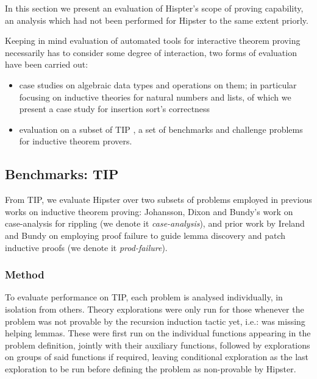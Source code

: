 \label{sec:evaluation}

In this section we present an evaluation of Hispter's scope of proving capability, an analysis which had not been performed for Hipster to the same extent priorly.

Keeping in mind evaluation of automated tools for interactive theorem proving necessarily has to consider some degree of interaction, two forms of evaluation have been carried out:

\begin{itemize}
\item case studies on algebraic data types and operations on them; in particular focusing on inductive theories for natural numbers and lists, of which we present a case study for insertion sort's correctness

\item evaluation on a subset of TIP \cite{tip-benchmarks}, a set of benchmarks and challenge problems for inductive theorem provers.
\end{itemize}


\subsection{Benchmarks: TIP}

From TIP, we evaluate Hipster over two subsets of problems employed in previous works on inductive theorem proving: Johansson, Dixon and Bundy's work on case-analysis for rippling \cite{IsaPcase} (we denote it \emph{case-analysis}), and prior work by Ireland and Bundy on employing proof failure to guide lemma discovery and patch inductive proofs \cite{productiveuse} (we denote it \emph{prod-failure}).

\subsubsection{Method}

To evaluate performance on TIP, each problem is analysed individually, in isolation from others.
%
Theory explorations were only run for those whenever the problem was not provable by the recursion induction tactic yet, i.e.: was missing helping lemmas.
%
These were first run on the individual functions appearing in the problem definition, jointly with their auxiliary functions, followed by explorations on groups of said functions if required, leaving conditional exploration as the last exploration to be run before defining the problem as non-provable by Hipster.

